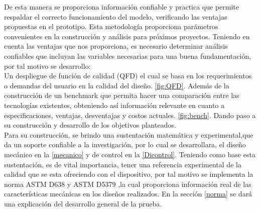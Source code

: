 De esta manera se proporciona información confiable y practica que permite respaldar el correcto funcionamiento del modelo, verificando las ventajas propuestas en el prototipo. Esta metodología proporciona parámetros convenientes en la construcción y análisis para próximos proyectos. Teniendo en cuenta las ventajas que nos proporciona, es necesario determinar análisis confiables que incluyan las variables necesarias para una buena fundamentación, por tal motivo se desarrollo:\\


Un despliegue de función de calidad (QFD) el cual se basa en los requerimientos o demandas del usuario en la calidad del diseño. \ref{fig:QFD}. Además de la construcción de un benchmark que permita hacer una comparación entre las tecnologías existentes, obteniendo así información relevante en cuanto a especificaciones, ventajas, desventajas y costos actuales. \ref{fig:bench}. Dando paso a su construcción y desarrollo de los objetivos planteados.\\


Para su construcción, se brindo una sustentación matemática y experimental,que da un soporte confiable a la investigación, por lo cual se desarrollara, el diseño mecánico en la \autoref{mecanico} y de control en la \autoref{Dicontrol}. Teniendo como base esta sustentación, es de vital importancia, tener una referencia experimental de la calidad que se esta ofreciendo con el dispositivo, por tal motivo se implementa la norma \acrshort{ASTM} D638 y \acrshort{ASTM} D5379 ,la cual proporciona información real de las características mecánicas en los diseños realizados. En la sección \ref{norma} se dará una explicación del desarrollo general de la prueba.


